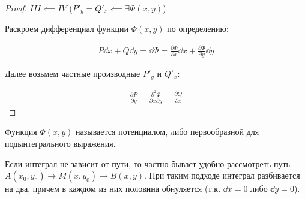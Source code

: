 \begin{proof}
  \(III \impliedby IV\) (\(P'_{y} = Q'_{x} \impliedby \exists \Phi(x, y)\))

  Раскроем дифференциал функции \(\Phi(x, y)\) по определению:

  \begin{align*}
    P \dd x + Q \dd y
    = \dd \Phi
    = \frac{\partial \Phi}{\partial x} \dd x
      + \frac{\partial \Phi}{\partial y} \dd y
  \end{align*}

  Далее возьмем частные производные \(P'_{y}\) и \(Q'_{x}\):

  \begin{align*}
    \frac{\partial P}{\partial y}
      = \frac{\partial^2 \Phi}{\partial x \partial y} 
      = \frac{\partial Q}{\partial x}
  \end{align*}
\end{proof}

\begin{remark}
  Функция \(\Phi(x, y)\) называется потенциалом, либо первообразной для
  подынтегрального выражения.
\end{remark}

\begin{twocolumns}
  
  \columnbreak

  \begin{remark}
    Если интеграл не зависит от пути, то частно бывает удобно рассмотреть путь
    \(A(x_{0}, y_{0}) \to M(x, y_{0}) \to B(x, y)\). При таким подходе интеграл
    разбивается на два, причем в каждом из них половина обнуляется (т.к.
    \(\dd x = 0\) либо \(\dd y = 0\)).
  \end{remark}
\end{twocolumns}



